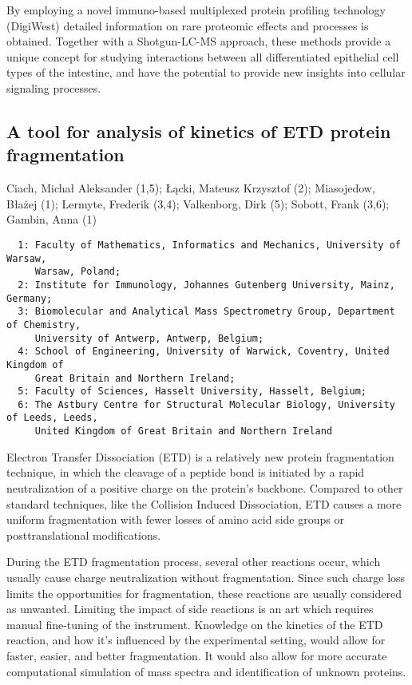 {By employing a novel immuno-based multiplexed protein profiling technology (DigiWest) detailed information on rare proteomic effects and processes is obtained. Together with a Shotgun-LC-MS approach, these methods provide a unique concept for studying interactions between all differentiated epithelial cell types of the intestine, and have the potential to provide new insights into cellular signaling processes.


\subsection*{\color{eubicRed} A tool for analysis of kinetics of ETD protein fragmentation}
{\color{eubicGray}Ciach, Michał Aleksander (1,5);
Łącki, Mateusz Krzysztof (2);
Miasojedow, Błażej (1);
Lermyte, Frederik (3,4);
Valkenborg, Dirk (5);
Sobott, Frank (3,6);
Gambin, Anna (1)}
{\color{eubicGray}\begin{verbatim}
  1: Faculty of Mathematics, Informatics and Mechanics, University of Warsaw,
     Warsaw, Poland;
  2: Institute for Immunology, Johannes Gutenberg University, Mainz, Germany;
  3: Biomolecular and Analytical Mass Spectrometry Group, Department of Chemistry,
     University of Antwerp, Antwerp, Belgium;
  4: School of Engineering, University of Warwick, Coventry, United Kingdom of
     Great Britain and Northern Ireland;
  5: Faculty of Sciences, Hasselt University, Hasselt, Belgium;
  6: The Astbury Centre for Structural Molecular Biology, University of Leeds, Leeds,
     United Kingdom of Great Britain and Northern Ireland
\end{verbatim}}

Electron Transfer Dissociation (ETD) is a relatively new protein fragmentation technique, in which the cleavage of a peptide bond is initiated by a rapid neutralization of a positive charge on the protein's backbone. Compared to other standard techniques, like the Collision Induced Dissociation, ETD causes a more uniform fragmentation with fewer losses of amino acid side groups or posttranslational modifications.

During the ETD fragmentation process, several other reactions occur, which usually cause charge neutralization without fragmentation. Since such charge loss limits the opportunities for fragmentation, these reactions are usually considered as unwanted. Limiting the impact of side reactions is an art which requires manual fine-tuning of the instrument. Knowledge on the kinetics of the ETD reaction, and how it's influenced by the experimental setting, would allow for faster, easier, and better fragmentation. It would also allow for more accurate computational simulation of mass spectra and identification of unknown proteins.

}
